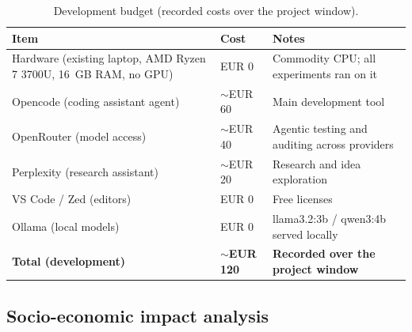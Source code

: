 \begin{table}[H]
\centering
\caption{Development budget (recorded costs over the project window).}
\label{tab:budget}
\small
\begin{tabular}{p{6.4cm}p{3.2cm}p{4.4cm}}
\toprule
\textbf{Item} & \textbf{Cost} & \textbf{Notes} \\
\midrule
Hardware (existing laptop, AMD Ryzen 7 3700U, 16~GB RAM, no GPU) & EUR 0 & Commodity CPU; all experiments ran on it \\
Opencode (coding assistant agent) & $\sim$EUR 60 & Main development tool \\
OpenRouter (model access) & $\sim$EUR 40 & Agentic testing and auditing across providers \\
Perplexity (research assistant) & $\sim$EUR 20 & Research and idea exploration \\
VS Code / Zed (editors) & EUR 0 & Free licenses \\
Ollama (local models) & EUR 0 & llama3.2:3b / qwen3:4b served locally \\
\midrule
\textbf{Total (development)} & \textbf{$\sim$EUR 120} & \textbf{Recorded over the project window} \\
\bottomrule
\end{tabular}
\end{table}

\subsection{Socio-economic impact analysis}

